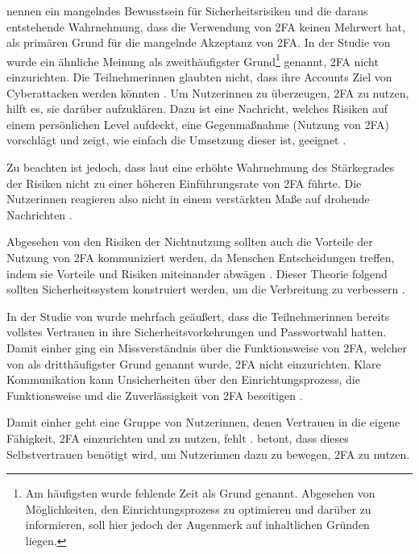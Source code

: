 \textcite{dasWhyJohnny2018} nennen ein mangelndes Bewusstsein für Sicherheitsrisiken und die daraus entstehende Wahrnehmung, dass die Verwendung von \ac{2FA} keinen Mehrwert hat, als primären Grund für die mangelnde Akzeptanz von \ac{2FA}. In der Studie von \parencite{ackermanImpedimentsAdoption2020} wurde ein ähnliche Meinung als zweithäufigster Grund\footnote{Am häufigsten wurde fehlende Zeit als Grund genannt. Abgesehen von Möglichkeiten, den Einrichtungsprozess zu optimieren und darüber zu informieren, soll hier jedoch der Augenmerk auf inhaltlichen Gründen liegen.} genannt, \ac{2FA} nicht einzurichten. Die Teilnehmerinnen glaubten nicht, dass ihre Accounts Ziel von Cyberattacken werden könnten \parencite{ackermanImpedimentsAdoption2020}. Um Nutzerinnen zu überzeugen, \ac{2FA} zu nutzen, hilft es, sie darüber aufzuklären. Dazu ist eine Nachricht, welches Risiken auf einem persönlichen Level aufdeckt, eine Gegenmaßnahme (Nutzung von \ac{2FA}) vorschlägt und zeigt, wie einfach die Umsetzung dieser ist, geeignet \parencite{ackermanImpedimentsAdoption2020}.

Zu beachten ist jedoch, dass laut \textcite{ackermanImpedimentsAdoption2020} eine erhöhte Wahrnehmung des Stärkegrades der Risiken nicht zu einer höheren Einführungsrate von \ac{2FA} führte. Die Nutzerinnen reagieren also nicht in einem verstärkten Maße auf drohende Nachrichten \parencite{ackermanImpedimentsAdoption2020}.

Abgesehen von den Risiken der Nichtnutzung sollten auch die Vorteile der Nutzung von \ac{2FA} kommuniziert werden, da Menschen Entscheidungen treffen, indem sie Vorteile und Risiken miteinander abwägen \parencite{dasWhyJohnny2018}. Dieser Theorie folgend sollten Sicherheitssystem konstruiert werden, um die Verbreitung zu verbessern \parencite{gargHeuristicsBiases2013}.

\pskip
In der Studie von \textcite{dasWhyJohnny2018} wurde mehrfach geäußert, dass die Teilnehmerinnen bereits vollstes Vertrauen in ihre Sicherheitsvorkehrungen und Passwortwahl hatten. Damit einher ging ein Missverständnis über die Funktionsweise von \ac{2FA}, welcher von \textcite{ackermanImpedimentsAdoption2020} als dritthäufigster Grund genannt wurde, \ac{2FA} nicht einzurichten. Klare Kommunikation kann Unsicherheiten über den Einrichtungsprozess, die Funktionsweise und die Zuverlässigkeit von \ac{2FA} beseitigen \parencite{ackermanImpedimentsAdoption2020}.

Damit einher geht eine Gruppe von Nutzerinnen, denen Vertrauen in die eigene Fähigkeit, \ac{2FA} einzurichten und zu nutzen, fehlt \parencite{ackermanImpedimentsAdoption2020}. \textcite{ackermanImpedimentsAdoption2020} betont, dass dieses Selbstvertrauen benötigt wird, um Nutzerinnen dazu zu bewegen, \ac{2FA} zu nutzen.


